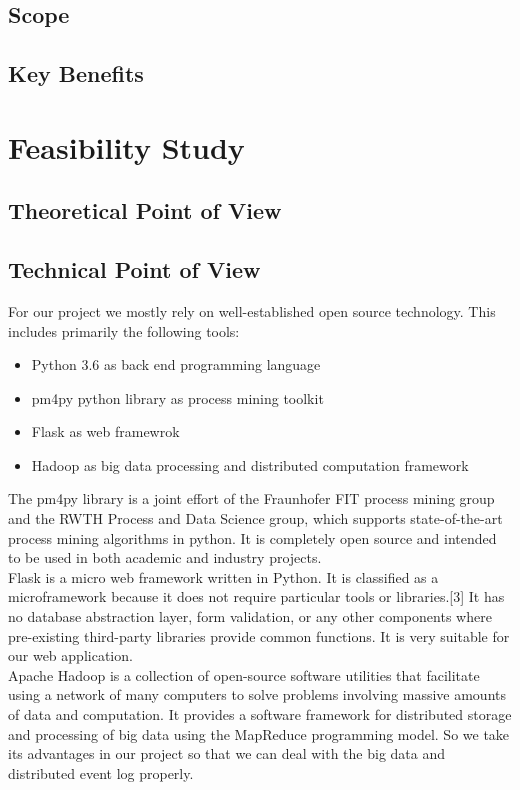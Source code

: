 \documentclass[runningheads]{llncs}
\begin{document}
\subsection{Scope}
\subsection{Key Benefits}

\section{Feasibility Study}

\subsection{Theoretical Point of View}
\subsection{Technical Point of View}
For our project we mostly rely on well-established open source technology. This includes primarily the following tools:\\


\begin{itemize}
\item Python 3.6 as back end programming language
\item pm4py python library as process mining toolkit
\item Flask as web framewrok
\item Hadoop as big data processing and distributed computation framework
\end{itemize}

\noindent
The pm4py library is a joint effort of the Fraunhofer FIT process mining group and the RWTH Process and Data Science group, which supports state-of-the-art process mining algorithms in python. It is completely open source and intended to be used in both academic and industry projects.\\

\noindent
Flask is a micro web framework written in Python. It is classified as a microframework because it does not require particular tools or libraries.[3] It has no database abstraction layer, form validation, or any other components where pre-existing third-party libraries provide common functions. It is very suitable for our web application.\\

\noindent
Apache Hadoop is a collection of open-source software utilities that facilitate using a network of many computers to solve problems involving massive amounts of data and computation. It provides a software framework for distributed storage and processing of big data using the MapReduce programming model. So we take its advantages in our project so that we can deal with the big data and distributed event log properly.
\end{document}
